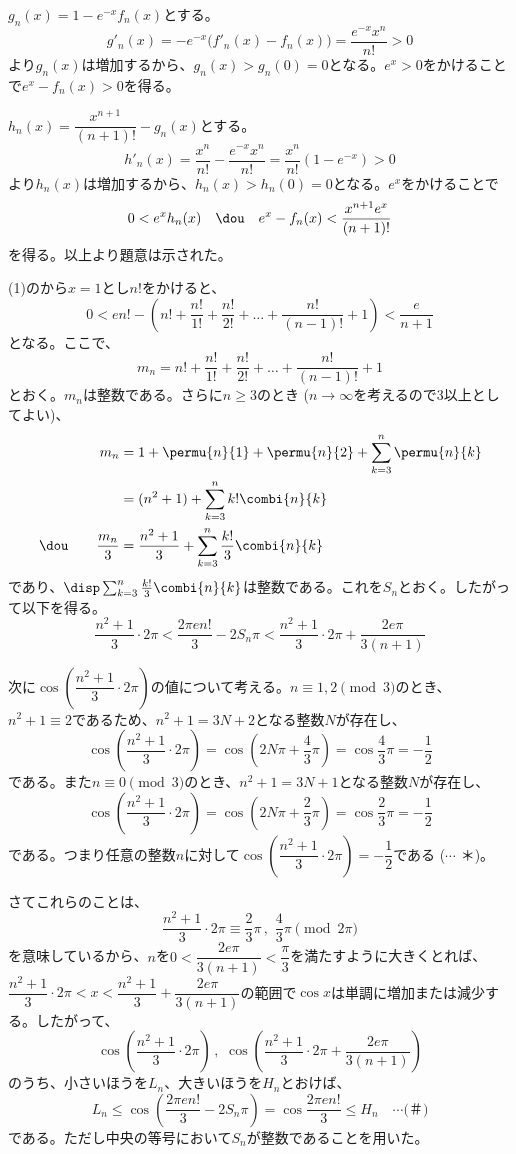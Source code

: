 
$g_n(x)=1-e^{-x}f_n(x)$とする。
\[ g'_n(x)=-e^{-x}\bigl(f'_n(x)-f_n(x)\bigr)=\frac{e^{-x}x^n}{n!}>0 \]
より$g_n(x)$は増加するから、$g_n(x)>g_n(0)=0$となる。$e^x>0$をかけることで$e^x-f_n(x)>0$を得る。

$h_n(x)=\dfrac{x^{n+1}}{(n+1)!}-g_n(x)$とする。
\[ h'_n(x)=\frac{x^n}{n!}-\frac{e^{-x}x^n}{n!}=\frac{x^n}{n!}(1-e^{-x})>0 \]
より$h_n(x)$は増加するから、$h_n(x)>h_n(0)=0$となる。$e^x$をかけることで
\[ 0<e^xh_n(x) \quad\dou\quad e^x-f_n(x)<\frac{x^{n+1}e^x}{(n+1)!} \]
を得る。以上より題意は示された。


(1)のから$x=1$とし$n!$をかけると、
\[ 0<en!-\left(n!+\frac{n!}{1!}+\frac{n!}{2!}+\dots +\frac{n!}{(n-1)!}+1\right) < \frac{e}{n+1} \]
となる。ここで、
\[ m_n=n!+\frac{n!}{1!}+\frac{n!}{2!}+\dots +\frac{n!}{(n-1)!}+1 \]
とおく。$m_n$は整数である。さらに$n\ge 3$のとき ($n\to\infty$を考えるので3以上としてよい)、
\begin{align*}
 m_n&= 1+\permu{n}{1}+\permu{n}{2}+\sum_{k=3}^n\permu{n}{k} \\
 &= (n^2+1)+\sum_{k=3}^nk!\combi{n}{k} \\
 \dou\qquad \frac{m_n}{3}&= \frac{n^2+1}{3}+\sum_{k=3}^n\frac{k!}{3}\combi{n}{k}
\end{align*}
であり、$\disp \sum_{k=3}^n\frac{k!}{3}\combi{n}{k}$は整数である。これを$S_n$とおく。したがって以下を得る。
\[ \frac{n^2+1}{3}\cdot 2\pi < \frac{2\pi e n!}{3}-2S_n\pi < \frac{n^2+1}{3}\cdot 2\pi+\frac{2e\pi}{3(n+1)} \]

次に$\cos\left(\dfrac{n^2+1}{3}\cdot 2\pi\right)$の値について考える。$n\equiv 1, 2 \pmod{3}$のとき、$n^2+1\equiv 2$であるため、$n^2+1=3N+2$となる整数$N$が存在し、
\[ \cos\left(\frac{n^2+1}{3}\cdot 2\pi\right)=\cos\left(2N\pi+\frac{4}{3}\pi\right)=\cos\frac{4}{3}\pi=-\frac{1}{2} \]
である。また$n\equiv 0 \pmod{3}$のとき、$n^2+1=3N+1$となる整数$N$が存在し、
\[ \cos\left(\frac{n^2+1}{3}\cdot 2\pi\right)=\cos\left(2N\pi+\frac{2}{3}\pi\right)=\cos\frac{2}{3}\pi=-\frac{1}{2} \]
である。つまり任意の整数$n$に対して$\cos\left(\dfrac{n^2+1}{3}\cdot 2\pi\right)=-\dfrac{1}{2}$である ($\cdots$ ＊)。

さてこれらのことは、
\[ \frac{n^2+1}{3}\cdot 2\pi \equiv \frac{2}{3}\pi \,,\,\, \frac{4}{3}\pi \pmod{2\pi} \]
を意味しているから、$n$を$0<\dfrac{2e\pi}{3(n+1)}<\dfrac{\pi}{3}$を満たすように大きくとれば、$\dfrac{n^2+1}{3}\cdot 2\pi<x<\dfrac{n^2+1}{3}+\dfrac{2e\pi}{3(n+1)}$の範囲で$\cos x$は単調に増加または減少する。したがって、
\[ \cos\left(\frac{n^2+1}{3}\cdot 2\pi\right) \,,\,\, \cos\left(\frac{n^2+1}{3}\cdot 2\pi+\frac{2e\pi}{3(n+1)}\right) \]
のうち、小さいほうを$L_n$、大きいほうを$H_n$とおけば、
\[ L_n \le \cos\left(\frac{2\pi e n!}{3}-2S_n\pi\right)=\cos\frac{2\pi e n!}{3} \le H_n \quad\cdots\text{(＃)} \]
である。ただし中央の等号において$S_n$が整数であることを用いた。


